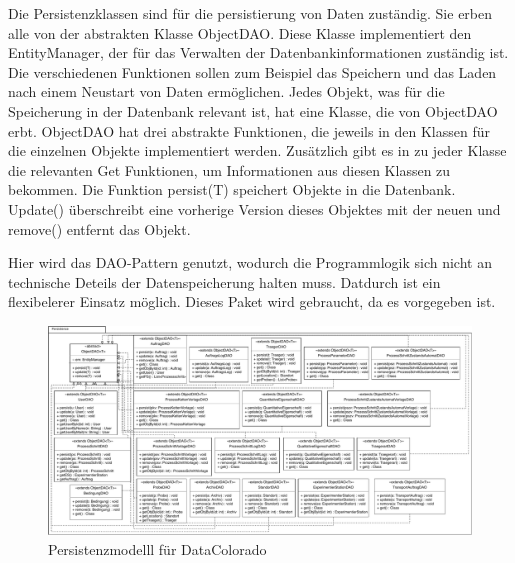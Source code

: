 \documentclass[enabledeprecatedfontcommands,fontsize=12pt,paper=a4,twoside]{scrartcl}
\begin{document}
{
Die Persistenzklassen sind für die persistierung von Daten zuständig. Sie erben alle von der abstrakten Klasse ObjectDAO. Diese Klasse implementiert den EntityManager, der für das Verwalten der Datenbankinformationen zuständig ist. Die verschiedenen Funktionen sollen zum Beispiel das Speichern und das Laden nach einem Neustart von Daten ermöglichen. Jedes Objekt, was für die Speicherung in der Datenbank relevant ist, hat eine Klasse, die von ObjectDAO erbt. ObjectDAO hat drei abstrakte Funktionen, die jeweils in den Klassen für die einzelnen Objekte implementiert werden. Zusätzlich gibt es in zu jeder Klasse die relevanten Get Funktionen, um Informationen aus diesen Klassen zu bekommen. Die Funktion persist(T) speichert Objekte in die Datenbank. Update() überschreibt eine vorherige Version dieses Objektes mit der neuen und remove() entfernt das Objekt.

Hier wird das DAO-Pattern genutzt, wodurch die Programmlogik sich nicht an technische Deteils der Datenspeicherung halten muss. Datdurch ist ein flexibelerer Einsatz möglich. 
Dieses Paket wird gebraucht, da es vorgegeben ist. 
}

 \begin{figure}
  \caption{Persistenzmodelll für DataColorado}
  \centering
  \includegraphics[width=\textwidth]{UML/Persistence}
 \end{figure}
 \newpage
\end{document}
